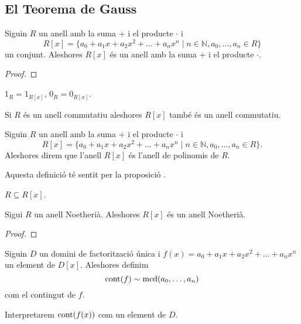 \documentclass[../../Main.tex]{subfiles}
\begin{document}
	\subsection{El Teorema de Gauss}
	\begin{proposition}
		\label{prop:l'anell de polinomis és un anell}
		Siguin \(R\) un anell amb la suma \(+\) i el producte \(\cdot\) i
		\[R[x]=\{a_{0}+a_{1}x+a_{2}x^{2}+\dots+a_{n}x^{n}\mid n\in\mathbb{N}, a_{0},\dots,a_{n}\in R\}\]
		un conjunt. Aleshores \(R[x]\) és un anell amb la suma \(+\) i el producte \(\cdot\).
		\begin{proof}
		\end{proof}
	\end{proposition}
	\begin{observation}
		\label{obs:els anells de polinomis conserven neutre i unitat}
		\(1_{R}=1_{R[x]}\), \(0_{R}=0_{R[x]}\).
	\end{observation}
	\begin{observation}
		\label{obs:els anells de polinomis conserven commutativitat}
		Si \(R\) és un anell commutatiu aleshores \(R[x]\) també és un anell commutatiu.
	\end{observation}
	\begin{definition}
		\label{def:anell de polinomis}
		Siguin \(R\) un anell amb la suma \(+\) i el producte \(\cdot\) i
		\[R[x]=\{a_{0}+a_{1}x+a_{2}x^{2}+\dots+a_{n}x^{n}\mid n\in\mathbb{N},a_{0},\dots,a_{n}\in R\}.\]
		Aleshores direm que l'anell \(R[x]\) és l'anell de polinomis de \(R\).
		
		Aquesta definició té sentit per la proposició .
	\end{definition}
	\begin{observation}
		\label{obs:un anell està contingut en el seu anell de polinomis}
		\(R\subseteq R[x]\).
	\end{observation}
	\begin{theorem}
		Sigui \(R\) un anell Noetherià. Aleshores \(R[x]\) és un anell Noetherià.
		\begin{proof}
		\end{proof}
	\end{theorem}
	\begin{definition}
		\label{def:contingut d'un polinomi}
		Siguin \(D\) un domini de factorització única i \(f(x)=a_{0}+a_{1}x+a_{2}x^{2}+\dots+a_{n}x^{n}\) un element de \(D[x]\). Aleshores definim
		\[\operatorname{cont}(f)\sim\operatorname{mcd}(a_{0},\dots,a_{n})\]
		com el contingut de \(f\). %
		
		Interpretarem \(\operatorname{cont}(f(x))\) com un element de \(D\).
	\end{definition}
\end{document}
